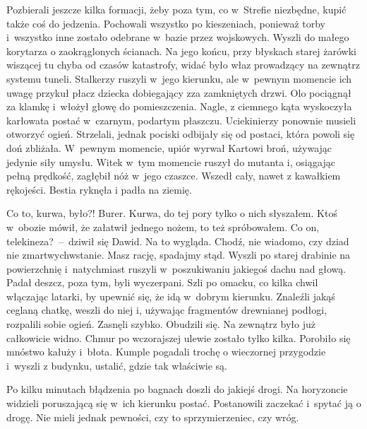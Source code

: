 \documentclass[../MAIN.tex]{subfiles}
\begin{document}
Pozbierali jeszcze kilka formacji, żeby poza tym, co w~Strefie niezbędne, kupić także coś do jedzenia. Pochowali wszystko po kieszeniach, ponieważ torby i~wszystko inne zostało odebrane w~bazie przez wojskowych. Wyszli do małego korytarza o zaokrąglonych ścianach. Na jego końcu, przy błyskach starej żarówki wiszącej tu chyba od czasów katastrofy, widać było właz prowadzący na zewnątrz systemu tuneli. Stalkerzy ruszyli w~jego kierunku, ale w~pewnym momencie ich uwagę przykuł płacz dziecka dobiegający zza zamkniętych drzwi. Olo pociągnął za klamkę i~włożył głowę do pomieszczenia. Nagle, z ciemnego kąta wyskoczyła karłowata postać w~czarnym, podartym płaszczu. Uciekinierzy ponownie musieli otworzyć ogień. Strzelali, jednak pociski odbijały się od postaci, która powoli się doń zbliżała. W~pewnym momencie, upiór wyrwał Kartowi broń, używając jedynie siły umysłu. Witek w~tym momencie ruszył do mutanta i, osiągając pełną prędkość, zagłębił nóż w~jego czaszce. Wszedł cały, nawet z kawałkiem rękojeści. Bestia ryknęła
i padła na ziemię.

\sd
\xx Co to, kurwa, było?!
\xx Burer. Kurwa, do tej pory tylko o nich słyszałem. Ktoś w~obozie mówił, że załatwił jednego nożem, to też spróbowałem.
\xx Co on, telekineza?~--~dziwił się Dawid.
\xx Na to wygląda. Chodź, nie wiadomo, czy dziad nie zmartwychwstanie.
\xx Masz rację, spadajmy stąd.
\qm
 Wyszli po starej drabinie na powierzchnię i~natychmiast ruszyli w~poszukiwaniu jakiegoś dachu nad głową. Padał deszcz, poza tym, byli wyczerpani. Szli po omacku, co kilka chwil włączając latarki, by upewnić się, że idą w~dobrym kierunku. Znaleźli jakąś ceglaną chatkę, weszli do niej i, używając fragmentów drewnianej podłogi, rozpalili sobie ogień. Zasnęli szybko.
Obudzili się. Na zewnątrz było już całkowicie widno. Chmur po wczorajszej ulewie zostało tylko kilka. Porobiło się mnóstwo kałuży i~błota. Kumple pogadali trochę o wieczornej przygodzie i~wyszli z budynku, ustalić, gdzie tak właściwie są.

Po kilku minutach błądzenia po bagnach doszli do jakiejś drogi.
Na horyzoncie widzieli poruszającą się w~ich kierunku postać. Postanowili zaczekać i~spytać ją o drogę. Nie mieli jednak pewności, czy to sprzymierzeniec, czy wróg.%
\end{document}
